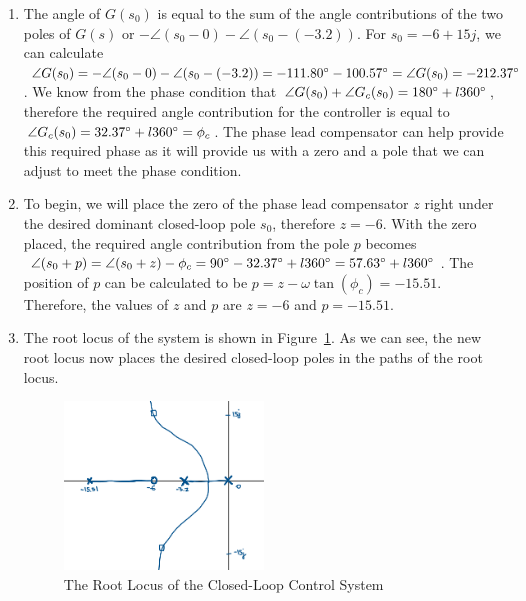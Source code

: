 \documentclass[12pt]{article}
\begin{document}
\begin{enumerate}
    \item %
    The angle of $G(s_0)$ is equal to the sum of the angle contributions of the two poles of $G(s)$ or $-\angle (s_0 - 0) - \angle (s_0 - (-3.2))$. For $s_0 = -6 + 15j$, we can calculate $\angle G(s_0) = -\angle (s_0 - 0) - \angle (s_0 - (-3.2)) = -111.80\degree - 100.57\degree = \angle G(s_0) = -212.37\degree$. We know from the phase condition that $\angle G(s_0) + \angle G_c(s_0) = 180\degree + l360\degree$, therefore the required angle contribution for the controller is equal to $\angle G_c(s_0) = 32.37\degree + l360\degree = \phi_c$. The phase lead compensator can help provide this required phase as it will provide us with a zero and a pole that we can adjust to meet the phase condition.

    \item %
    To begin, we will place the zero of the phase lead compensator $z$ right under the desired dominant closed-loop pole $s_0$, therefore $z = -6$. With the zero placed, the required angle contribution from the pole $p$ becomes $\angle (s_0 + p) = \angle (s_0 + z) - \phi_c  = 90\degree - 32.37\degree + l360\degree = 57.63\degree + l360\degree$. The position of $p$ can be calculated to be $p = z - \omega \tan(\phi_c) = -15.51$. Therefore, the values of $z$ and $p$ are $z = -6$ and $p = -15.51$.

    \item %
    The root locus of the system is shown in Figure~\ref{fig:q5_root_locus}. As we can see, the new root locus now places the desired closed-loop poles in the paths of the root locus.
    \begin{figure}[h]
        \centering
        \includegraphics[width=0.5\textwidth]{q5}
        \caption{\label{fig:q5_root_locus}The Root Locus of the Closed-Loop Control System}
    \end{figure}


\end{enumerate}
\end{document}
